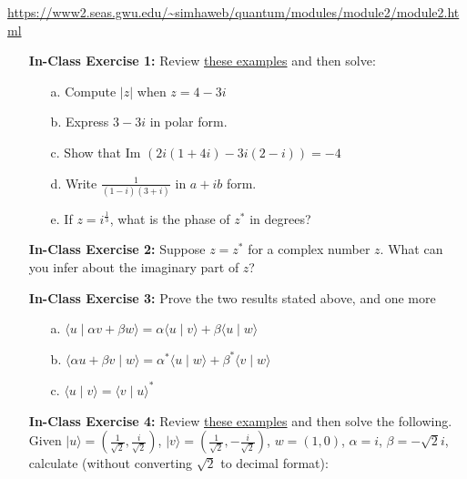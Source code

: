 \documentclass[main.tex]{subfiles}
\begin{document}
\url{https://www2.seas.gwu.edu/~simhaweb/quantum/modules/module2/module2.html}

\begin{enumerate}

\item[] \textbf{In-Class Exercise 1:} Review \href{https://www2.seas.gwu.edu/~simhaweb/quantum/modules/module2/problems2.html#complex}{these examples} and then solve:

    \begin{enumerate}
        \item[a.] Compute $|z|$ when $z=4-3 i$
        \item[b.] Express $3-3 i$ in polar form.
        \item[c.] Show that Im $(2 i(1+4 i)-3 i(2-i))=-4$
        \item[d.] Write $\frac{1}{(1-i)(3+i)}$ in $a+ib$ form.
        \item[e.] If $z=i^{\frac{1}{3}}$, what is the phase of $z^{*}$ in degrees?
    \end{enumerate}

\item[] \textbf{In-Class Exercise 2:} Suppose $z=z^{*}$ for a complex number $z$. What can you infer about the imaginary part of $z$?

\item[] \textbf{In-Class Exercise 3:} Prove the two results stated above, and one more

    \begin{enumerate}
        \item[a.] $\langle u \mid \alpha v+\beta w\rangle=\alpha\langle u \mid v\rangle+\beta\langle u \mid w\rangle$
        \item[b.] $\langle\alpha u+\beta v \mid w\rangle=\alpha^{*}\langle u \mid w\rangle+\beta^{*}\langle v \mid w\rangle$
        \item[c.] $\langle u \mid v\rangle=\langle v \mid u\rangle^{*}$
    \end{enumerate}

\item[] \textbf{In-Class Exercise 4:} Review \href{https://www2.seas.gwu.edu/~simhaweb/quantum/modules/module2/problems2.html#vectors}{these examples} and then solve the following. Given $|u\rangle=\left(\frac{1}{\sqrt{2}}, \frac{i}{\sqrt{2}}\right)$, $|v\rangle=\left(\frac{1}{\sqrt{2}}, -\frac{i}{\sqrt{2}}\right)$, $w=(1,0)$, $\alpha=i$, $\beta=-\sqrt{2}i$, calculate (without converting $\sqrt{2}$ to decimal format):


\end{enumerate}
\end{document}
